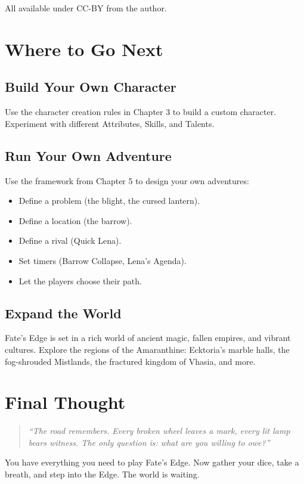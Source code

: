 \documentclass[11pt]{book}
\begin{document}
All available under CC-BY from the author.

\section{Where to Go Next}

\subsection*{Build Your Own Character}
Use the character creation rules in Chapter 3 to build a custom character. Experiment with different Attributes, Skills, and Talents.

\subsection*{Run Your Own Adventure}
Use the framework from Chapter 5 to design your own adventures:
\begin{itemize}
  \item Define a problem (the blight, the cursed lantern).
  \item Define a location (the barrow).
  \item Define a rival (Quick Lena).
  \item Set timers (Barrow Collapse, Lena's Agenda).
  \item Let the players choose their path.
\end{itemize}

\subsection*{Expand the World}
Fate's Edge is set in a rich world of ancient magic, fallen empires, and vibrant cultures. Explore the regions of the Amaranthine: Ecktoria's marble halls, the fog-shrouded Mistlands, the fractured kingdom of Vhasia, and more.

\section{Final Thought}

\begin{quote}
\textit{``The road remembers. Every broken wheel leaves a mark, every lit lamp bears witness. The only question is: what are you willing to owe?''}
\end{quote}

You have everything you need to play Fate's Edge. Now gather your dice, take a breath, and step into the Edge. The world is waiting.
\end{document}
